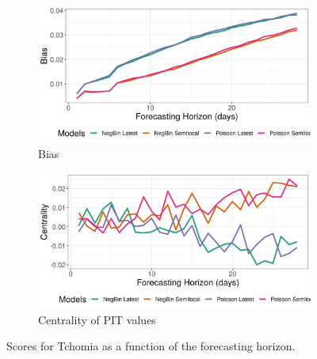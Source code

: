 \begin{figure}[H]
\begin{subfigure}{0.5\textwidth}
  \centering
  \includegraphics[width=\linewidth]{../output/Tchomia_bias.png}  
  \caption{Bias}
  \label{fig:Tchomia_scores_3}
\end{subfigure}
\begin{subfigure}{0.5\textwidth}
  \centering
  \includegraphics[width=\linewidth]{../output/Tchomia_centrality.png}  
  \caption{Centrality of PIT values}
  \label{fig:Tchomia_scores_4}
\end{subfigure}
  \caption{Scores for Tchomia as a function of the forecasting horizon.}

  \label{fig:nat_scores}
\end{figure}
